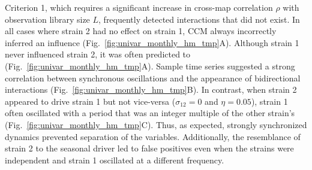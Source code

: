 Criterion 1, which requires a significant increase in cross-map correlation $\rho$ with observation library size $L$, frequently detected interactions that did not exist.
In all cases where strain 2 had no effect on strain 1, CCM always incorrectly inferred an influence (Fig.~\ref{fig:univar_monthly_hm_tmp}A).
Although strain 1 never influenced strain 2, it was often predicted to (Fig.~\ref{fig:univar_monthly_hm_tmp}A). 
Sample time series suggested a strong correlation between synchronous oscillations and the appearance of bidirectional interactions (Fig.~\ref{fig:univar_monthly_hm_tmp}B).
In contrast, when strain 2 appeared to drive strain 1 but not vice-versa ($\sigma_{12}=0$ and $\eta=0.05$), strain 1 often oscillated with a period that was an integer multiple of the other strain's (Fig.~\ref{fig:univar_monthly_hm_tmp}C).
Thus, as expected, strongly synchronized dynamics prevented separation of the variables.
Additionally, the resemblance of strain 2 to the seasonal driver led to false positives even when the strains were independent and strain 1 oscillated at a different frequency.

